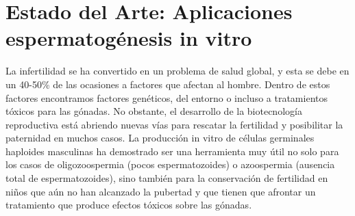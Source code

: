 \documentclass[a4paper,11pt]{article}
\begin{document}
\section{Estado del Arte: Aplicaciones espermatogénesis in vitro}
La infertilidad se ha convertido en un problema de salud global, y esta se debe en un 40-50\% de las ocasiones a factores que afectan al hombre. Dentro de estos factores encontramos factores genéticos, del entorno o incluso a tratamientos tóxicos para las gónadas. No obstante, el desarrollo de la biotecnología reproductiva está abriendo nuevas vías para rescatar la fertilidad y posibilitar la paternidad en muchos casos. La producción in vitro de células germinales haploides masculinas ha demostrado ser una herramienta muy útil no solo para los casos de oligozoospermia (pocos espermatozoides) o azoospermia (ausencia total de espermatozoides), sino también para la conservación de fertilidad en niños que aún no han alcanzado la pubertad y que tienen que afrontar un tratamiento que produce efectos tóxicos sobre las gónadas. 
\end{document}
